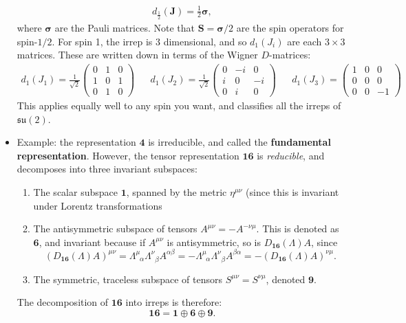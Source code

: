 \documentclass[12pt, oneside]{article}   	%
\theoremstyle{definition}
\begin{document}
\begin{itemize}
\begin{answerbox}
	\begin{align}
		d_\frac{1}{2}(\bm J) = \frac{1}{2} \bm \sigma,
	\end{align}
	where $\bm \sigma$ are the Pauli matrices. Note that $\bm S = \bm \sigma / 2$ are the spin operators for spin-$1/2$. For spin 1, the irrep is 3 dimensional, and so $d_1(J_i)$ are each $3\times 3$ matrices. These are written down in terms of the Wigner $D$-matrices:
	\begin{align}
		d_1(J_1) = \frac{1}{\sqrt 2} \begin{pmatrix} 0 & 1 & 0 \\ 1 & 0 & 1 \\ 0 & 1 & 0 \end{pmatrix} &&
		d_1(J_2) = \frac{1}{\sqrt 2} \begin{pmatrix} 0 & -i & 0 \\ i & 0 & -i \\ 0 & i & 0 \end{pmatrix} &&
		d_1(J_3) = \begin{pmatrix} 1 & 0 & 0 \\ 0 & 0 & 0 \\ 0 & 0 & -1 \end{pmatrix}
	\end{align}
	This applies equally well to any spin you want, and classifies all the irreps of $\mathfrak{su}(2)$. 
\end{answerbox}

	\item Example: the representation $\bm 4$ is irreducible, and called the \textbf{fundamental representation}. However, the tensor representation $\bm{16}$ is \textit{reducible}, and decomposes into three invariant subspaces:
	\begin{enumerate}
		\item The scalar subspace $\bm 1$, spanned by the metric $\eta^{\mu\nu}$ (since this is invariant under Lorentz transformations
		\item The antisymmetric subspace of tensors $A^{\mu\nu} = -A^{-\nu\mu}$. This is denoted as $\bm 6$, and invariant because if $A^{\mu\nu}$ is antisymmetric, so is $D_{\bm{16}}(\Lambda) A$, since 
		\begin{equation}
			(D_{\bm{16}}(\Lambda) A)^{\mu\nu} = \Lambda^\mu_{\;\;\alpha} \Lambda^\nu_{\;\;\beta} A^{\alpha\beta} = - \Lambda^\mu_{\;\;\alpha} \Lambda^\nu_{\;\;\beta} A^{\beta\alpha} = - (D_{\bm{16}}(\Lambda) A)^{\nu\mu}.
		\end{equation}
		\item The symmetric, traceless subspace of tensors $S^{\mu\nu} = S^{\nu\mu}$, denoted $\bm 9$. 
	\end{enumerate}
	The decomposition of $\bm{16}$ into irreps is therefore:
	\begin{equation}
		\bm{16} = \bm 1 \oplus \bm 6 \oplus \bm 9.
	\end{equation}
	

\end{itemize}
\end{document}
